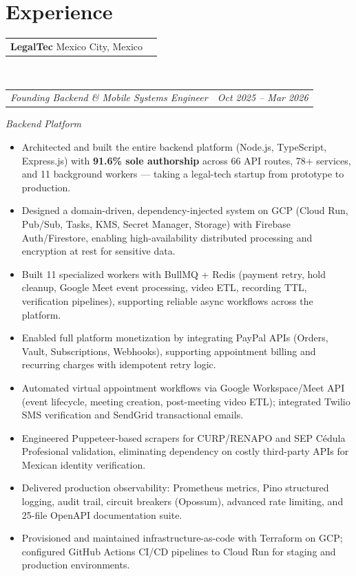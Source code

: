 \documentclass[11pt, letterpaper]{article}
\makeatletter
\newcommand{\entry}[2]{%
  \noindent\begin{tabular*}{\textwidth}{@{}l@{\extracolsep{\fill}}r@{}}
    #1 & #2
  \end{tabular*}}
\newenvironment{cvlist}{%
  \begin{itemize}[leftmargin=1.4em,itemsep=1.5pt,topsep=3pt,parsep=0pt]
}{\end{itemize}}
\makeatother
\begin{document}
\section{Experience}

\entry{\textbf{LegalTec} \quad Mexico City, Mexico}{}\\
\entry{\textit{Founding Backend \& Mobile Systems Engineer}}{\textit{Oct 2025 -- Mar 2026}}

\vspace{3pt}
\textit{Backend Platform}
\begin{cvlist}
  \item Architected and built the entire backend platform (Node.js, TypeScript, Express.js)
        with \textbf{91.6\% sole authorship} across 66 API routes, 78+ services, and 11
        background workers — taking a legal-tech startup from prototype to production.
  \item Designed a domain-driven, dependency-injected system on GCP (Cloud Run, Pub/Sub,
        Tasks, KMS, Secret Manager, Storage) with Firebase Auth/Firestore, enabling
        high-availability distributed processing and encryption at rest for sensitive data.
  \item Built 11 specialized workers with BullMQ + Redis (payment retry, hold cleanup,
        Google Meet event processing, video ETL, recording TTL, verification pipelines),
        supporting reliable async workflows across the platform.
  \item Enabled full platform monetization by integrating PayPal APIs (Orders, Vault,
        Subscriptions, Webhooks), supporting appointment billing and recurring charges
        with idempotent retry logic.
  \item Automated virtual appointment workflows via Google Workspace/Meet API (event
        lifecycle, meeting creation, post-meeting video ETL); integrated Twilio SMS
        verification and SendGrid transactional emails.
  \item Engineered Puppeteer-based scrapers for CURP/RENAPO and SEP C\'{e}dula
        Profesional validation, eliminating dependency on costly third-party APIs
        for Mexican identity verification.
  \item Delivered production observability: Prometheus metrics, Pino structured logging,
        audit trail, circuit breakers (Opossum), advanced rate limiting, and 25-file
        OpenAPI documentation suite.
  \item Provisioned and maintained infrastructure-as-code with Terraform on GCP;
        configured GitHub Actions CI/CD pipelines to Cloud Run for staging and
        production environments.
\end{cvlist}
\end{document}
